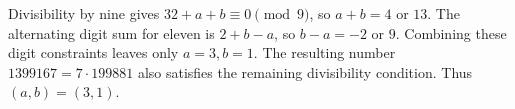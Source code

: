 Divisibility by nine gives $32+a+b\equiv0\pmod9$, so $a+b=4$ or $13$. The alternating digit sum for eleven is $2+b-a$, so $b-a=-2$ or $9$. Combining these digit constraints leaves only $a=3,b=1$. The resulting number $1399167=7\cdot199881$ also satisfies the remaining divisibility condition. Thus $\boxed{(a,b)=(3,1)}$.
